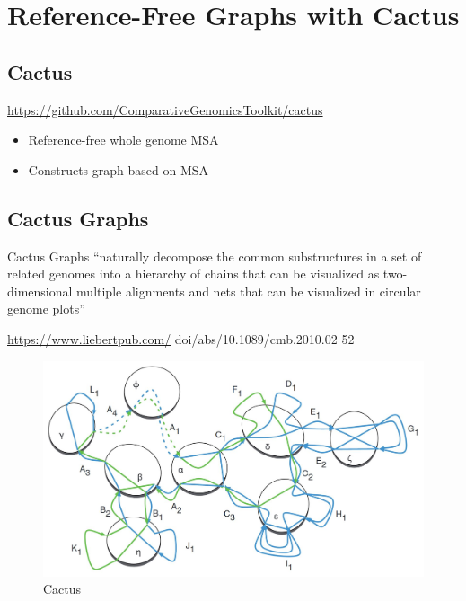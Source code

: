 \documentclass[
]{book}
\providecommand{\tightlist}{%
  \setlength{\itemsep}{0pt}\setlength{\parskip}{0pt}}
\begin{document}
\hypertarget{reference-free-graphs-with-cactus}{%
\chapter{Reference-Free Graphs with Cactus}\label{reference-free-graphs-with-cactus}}

\hypertarget{cactus}{%
\section{Cactus}\label{cactus}}

\url{https://github.com/ComparativeGenomicsToolkit/cactus}

\begin{itemize}
\tightlist
\item
  Reference-free whole genome MSA
\item
  Constructs graph based on MSA
\end{itemize}

\hypertarget{cactus-graphs}{%
\section{Cactus Graphs}\label{cactus-graphs}}

Cactus Graphs ``naturally decompose the common substructures in a set of related genomes into a hierarchy of chains that can be visualized as two-dimensional multiple alignments and nets that can be visualized in circular genome plots''

\url{https://www.liebertpub.com/} doi/abs/10.1089/cmb.2010.02 52

\begin{figure}
\centering
\includegraphics[width=1\textwidth,height=\textheight]{./Figures/Cactus.png}
\caption{Cactus}
\end{figure}
\end{document}
